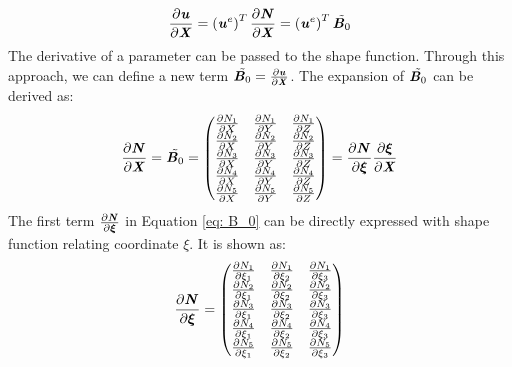 \begin{equation}
\frac{\partial \textbf{\textit{u}}}{\partial \textbf{\textit{X}}} = \left(\textbf{\textit{u}}^e\right)^T \frac{\partial \textbf{\textit{N}}}{\partial \textbf{\textit{X}}} = \left(\textbf{\textit{u}}^e\right)^T \tilde{\textbf{\textit{B}}_0}
\end{equation}
The derivative of a parameter can be passed to the shape function. Through this approach, we can define a new term $\tilde{\textbf{\textit{B}}_0} = \frac{\partial \textbf{\textit{u}}}{\partial \textbf{\textit{X}}}$. The expansion of $\tilde{\textbf{\textit{B}}_0}$ can be derived as:
\begin{equation} \label{eq: B_0}
\frac{\partial \textbf{\textit{N}}}{\partial \textbf{\textit{X}}} = \tilde{\textbf{\textit{B}}_0} = \begin{pmatrix}
\frac{\partial N_1}{\partial X} & \frac{\partial N_1}{\partial Y} & \frac{\partial N_1}{\partial Z} \\
\frac{\partial N_2}{\partial X} & \frac{\partial N_2}{\partial Y} & \frac{\partial N_2}{\partial Z} \\
\frac{\partial N_3}{\partial X} & \frac{\partial N_3}{\partial Y} & \frac{\partial N_3}{\partial Z} \\
\frac{\partial N_4}{\partial X} & \frac{\partial N_4}{\partial Y} & \frac{\partial N_4}{\partial Z} \\
\frac{\partial N_5}{\partial X} & \frac{\partial N_5}{\partial Y} & \frac{\partial N_5}{\partial Z} \\
\end{pmatrix} = \frac{\partial \textbf{\textit{N}}}{\partial \boldsymbol{\xi}} \frac{\partial \boldsymbol{\xi}}{\partial \textbf{\textit{X}}}
\end{equation}
The first term $\frac{\partial \textbf{\textit{N}}}{\partial \boldsymbol{\xi}}$ in Equation \ref{eq: B_0} can be directly expressed with shape function relating coordinate $\xi$. It is shown as:
\begin{equation}
\frac{\partial \textbf{\textit{N}}}{\partial \boldsymbol{\xi}} = \begin{pmatrix}
\frac{\partial N_1}{\partial \xi_1} & \frac{\partial N_1}{\partial \xi_2} & \frac{\partial N_1}{\partial \xi_3} \\
\frac{\partial N_2}{\partial \xi_1} & \frac{\partial N_2}{\partial
	\xi_2} & \frac{\partial N_2}{\partial \xi_3} \\
\frac{\partial N_3}{\partial \xi_1} & \frac{\partial N_3}{\partial \xi_2} & \frac{\partial N_3}{\partial \xi_3} \\
\frac{\partial N_4}{\partial \xi_1} & \frac{\partial N_4}{\partial \xi_2} & \frac{\partial N_4}{\partial \xi_3} \\
\frac{\partial N_5}{\partial \xi_1} & \frac{\partial N_5}{\partial \xi_2} & \frac{\partial N_5}{\partial \xi_3} \\
\end{pmatrix}
\end{equation}
